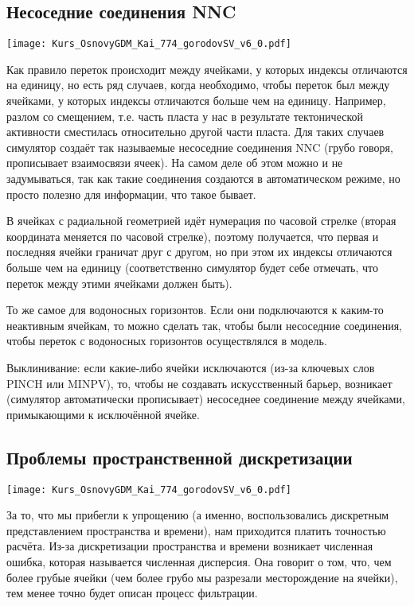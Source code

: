 \documentclass[main.tex]{subfiles}
\begin{document}
\subsection{Несоседние соединения NNC}

\texttt{[image: Kurs\_OsnovyGDM\_Kai\_774\_gorodovSV\_v6\_0.pdf]}

Как правило переток происходит между ячейками, у которых индексы отличаются на единицу, но есть ряд случаев, когда необходимо, чтобы переток был между ячейками, у которых индексы отличаются больше чем на единицу.
Например, разлом со смещением, т.е. часть пласта у нас в результате тектонической активности сместилась относительно другой части пласта.
Для таких случаев симулятор создаёт так называемые несоседние соединения NNC (грубо говоря, прописывает взаимосвязи ячеек).
На самом деле об этом можно и не задумываться, так как такие соединения создаются в автоматическом режиме, но просто полезно для информации, что такое бывает.

В ячейках с радиальной геометрией идёт нумерация по часовой стрелке (вторая координата меняется по часовой стрелке), поэтому получается, что первая и последняя ячейки граничат друг с другом, но при этом их индексы отличаются больше чем на единицу (соответственно симулятор будет себе отмечать, что переток между этими ячейками должен быть).

То же самое для водоносных горизонтов.
Если они подключаются к каким-то неактивным ячейкам, то можно сделать так, чтобы были несоседние соединения, чтобы переток с водоносных горизонтов осуществлялся в модель.

Выклинивание: если какие-либо ячейки исключаются (из-за ключевых слов PINCH или MINPV), то, чтобы не создавать искусственный барьер, возникает (симулятор автоматически прописывает) несоседнее соединение между ячейками, примыкающими к исключённой ячейке.

\subsection{Проблемы пространственной дискретизации}

\texttt{[image: Kurs\_OsnovyGDM\_Kai\_774\_gorodovSV\_v6\_0.pdf]}

За то, что мы прибегли к упрощению (а именно, воспользовались дискретным представлением пространства и времени), нам приходится платить точностью расчёта.
Из-за дискретизации пространства и времени возникает численная ошибка, которая называется численная дисперсия.
Она говорит о том, что, чем более грубые ячейки (чем более грубо мы разрезали месторождение на ячейки), тем менее точно будет описан процесс фильтрации.
\end{document}
